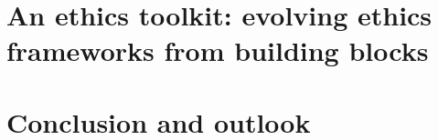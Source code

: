\section{An ethics toolkit: evolving ethics frameworks from building blocks}

\section{Conclusion and outlook}